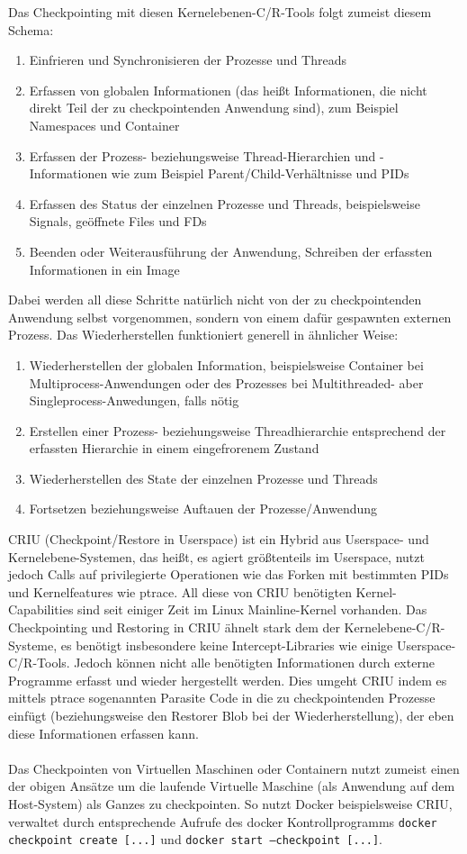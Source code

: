 \documentclass[a4paper]{article}
\begin{document}
Das Checkpointing mit diesen Kernelebenen-C/R-Tools folgt zumeist diesem Schema:
\begin{enumerate}
    \item Einfrieren und Synchronisieren der Prozesse und Threads
    \item Erfassen von globalen Informationen (das heißt Informationen, die nicht direkt Teil der zu checkpointenden Anwendung sind), zum Beispiel Namespaces und Container
    \item Erfassen der Prozess- beziehungsweise Thread-Hierarchien und -Informationen wie zum Beispiel Parent/Child-Verhältnisse und PIDs
    \item Erfassen des Status der einzelnen Prozesse und Threads, beispielsweise Signals, geöffnete Files und FDs
    \item Beenden oder Weiterausführung der Anwendung, Schreiben der erfassten Informationen in ein Image
\end{enumerate}
Dabei werden all diese Schritte natürlich nicht von der zu checkpointenden Anwendung selbst vorgenommen, sondern von einem dafür gespawnten externen Prozess. Das Wiederherstellen funktioniert generell in ähnlicher Weise:
\begin{enumerate}
    \item Wiederherstellen der globalen Information, beispielsweise Container bei Multiprocess-Anwendungen oder des Prozesses bei Multithreaded- aber Singleprocess-Anwedungen, falls nötig
    \item Erstellen einer Prozess- beziehungsweise Threadhierarchie entsprechend der erfassten Hierarchie in einem eingefrorenem Zustand
    \item Wiederherstellen des State der einzelnen Prozesse und Threads
    \item Fortsetzen beziehungsweise Auftauen der Prozesse/Anwendung
\end{enumerate}
CRIU\cite{CRIU} (Checkpoint/Restore in Userspace) ist ein Hybrid aus Userspace- und Kernelebene-Systemen, das heißt, es agiert größtenteils im Userspace, nutzt jedoch Calls auf privilegierte Operationen wie das Forken mit bestimmten PIDs und Kernelfeatures wie ptrace.
All diese von CRIU benötigten Kernel-Capabilities sind seit einiger Zeit im Linux Mainline-Kernel vorhanden.
Das Checkpointing und Restoring in CRIU ähnelt stark dem der Kernelebene-C/R-Systeme, es benötigt insbesondere keine Intercept-Libraries wie einige Userspace-C/R-Tools. 
Jedoch können nicht alle benötigten Informationen durch externe Programme erfasst und wieder hergestellt werden. 
Dies umgeht CRIU indem es mittels ptrace sogenannten Parasite Code in die zu checkpointenden Prozesse einfügt (beziehungsweise den Restorer Blob bei der Wiederherstellung), der eben diese Informationen erfassen kann.\\ \\
Das Checkpointen von Virtuellen Maschinen oder Containern nutzt zumeist einen der obigen Ansätze um die laufende Virtuelle Maschine (als Anwendung auf dem Host-System) als Ganzes zu checkpointen. 
So nutzt Docker beispielsweise CRIU, verwaltet durch entsprechende Aufrufe des docker Kontrollprogramms \texttt{docker checkpoint create [...]} und \texttt{docker start --checkpoint [...]}.
\end{document}
